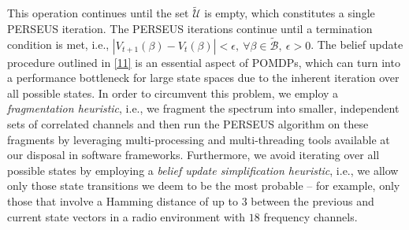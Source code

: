 \documentclass[10pt,twocolumn]{IEEEtran}
\begin{document}
This operation continues until the set $\tilde{\mathcal{U}}$ is empty, which constitutes a single PERSEUS iteration. The PERSEUS iterations continue until a termination condition is met, i.e., $|V_{t{+}1}(\beta){-}V_{t}(\beta)|{<}\epsilon,\ \forall \beta{\in} \tilde{\mathcal{B}},\ \epsilon{>}0$. The belief update procedure outlined in \eqref{11} is an essential aspect of POMDPs, which can turn into a performance bottleneck for large state spaces due to the inherent iteration over all possible states. In order to circumvent this problem, we employ a \emph{fragmentation heuristic}, i.e., we fragment the spectrum into smaller, independent sets of correlated channels and then run the PERSEUS algorithm on these fragments by leveraging multi-processing and multi-threading tools available at our disposal in software frameworks. Furthermore, we avoid iterating over all possible states by employing a \emph{belief update simplification heuristic}, i.e., we allow only those state transitions we deem to be the most probable -- for example, only those that involve a Hamming distance of up to $3$ between the previous and current state vectors in a radio environment with $18$ frequency channels.
\end{document}
